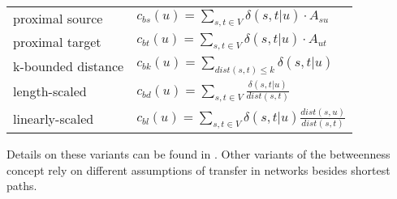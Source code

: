 \documentclass[]{book}
\theoremstyle{definition}
\theoremstyle{definition}
\theoremstyle{definition}
\theoremstyle{remark}
\begin{document}
\begin{longtable}[]{@{}ll@{}}
\toprule
\endhead
\begin{minipage}[t]{0.81\columnwidth}\raggedright
proximal source\strut
\end{minipage} & \begin{minipage}[t]{0.13\columnwidth}\raggedright
\(c_{bs}(u) = \sum\limits_{s,t \in V} \delta(s,t\lvert u)\cdot A_{su}\)\strut
\end{minipage}\tabularnewline
\begin{minipage}[t]{0.81\columnwidth}\raggedright
proximal target\strut
\end{minipage} & \begin{minipage}[t]{0.13\columnwidth}\raggedright
\(c_{bt}(u) = \sum\limits_{s,t \in V} \delta(s,t\lvert u)\cdot A_{ut}\)\strut
\end{minipage}\tabularnewline
\begin{minipage}[t]{0.81\columnwidth}\raggedright
k-bounded distance\strut
\end{minipage} & \begin{minipage}[t]{0.13\columnwidth}\raggedright
\(c_{bk}(u) = \sum\limits_{dist(s,t)\leq k} \delta(s,t\lvert u)\)\strut
\end{minipage}\tabularnewline
\begin{minipage}[t]{0.81\columnwidth}\raggedright
length-scaled\strut
\end{minipage} & \begin{minipage}[t]{0.13\columnwidth}\raggedright
\(c_{bd}(u) = \sum\limits_{s,t \in V} \frac{\delta(s,t\lvert u)}{dist(s,t)}\)\strut
\end{minipage}\tabularnewline
\begin{minipage}[t]{0.81\columnwidth}\raggedright
linearly-scaled\strut
\end{minipage} & \begin{minipage}[t]{0.13\columnwidth}\raggedright
\(c_{bl}(u) = \sum\limits_{s,t \in V} \delta(s,t\lvert u)\frac{dist(s,u)}{dist(s,t)}\)\strut
\end{minipage}\tabularnewline
\bottomrule
\end{longtable}

Details on these variants can be found in \citet{b-vsbctgc-08}. Other
variants of the betweenness concept rely on different assumptions of
transfer in networks besides shortest paths.
\end{document}
